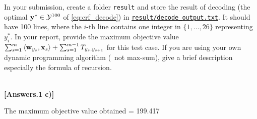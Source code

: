 \documentclass[11pt]{report}
\begin{document}
\begin{itemize}
	\begin{center}
	\end{center}
	
	In your submission, create a folder \verb#result# and store the result of decoding (the optimal $\mathbf{\boldsymbol{y}}^* \in \mathcal{Y}^{100}$ of \eqref{eq:crf_decode}) in \underline{\texttt{result/decode\_output.txt}}.
	It should have 100 lines,
	where the $i$-th line contains one integer in $\{1,\ldots,26\}$ representing $y^*_i$.
	In your report, provide the maximum objective value $\sum_{s=1}^m \left\langle \mathbf{\boldsymbol{w}}_{y_s},\mathbf{\boldsymbol{x}}_s \right\rangle + \sum_{s=1}^{m-1} T_{y_s, y_{s+1}}$ for this test case.
	If you are using your own dynamic programming algorithm (\ie\ not max-sum),
	give a brief description especially the formula of recursion.

	\\{\bf [Answers.1 c)]} 
	
    The maximum objective value obtained = 199.417
\end{itemize}

%
%
%
%
%
%
%
\end{document}
